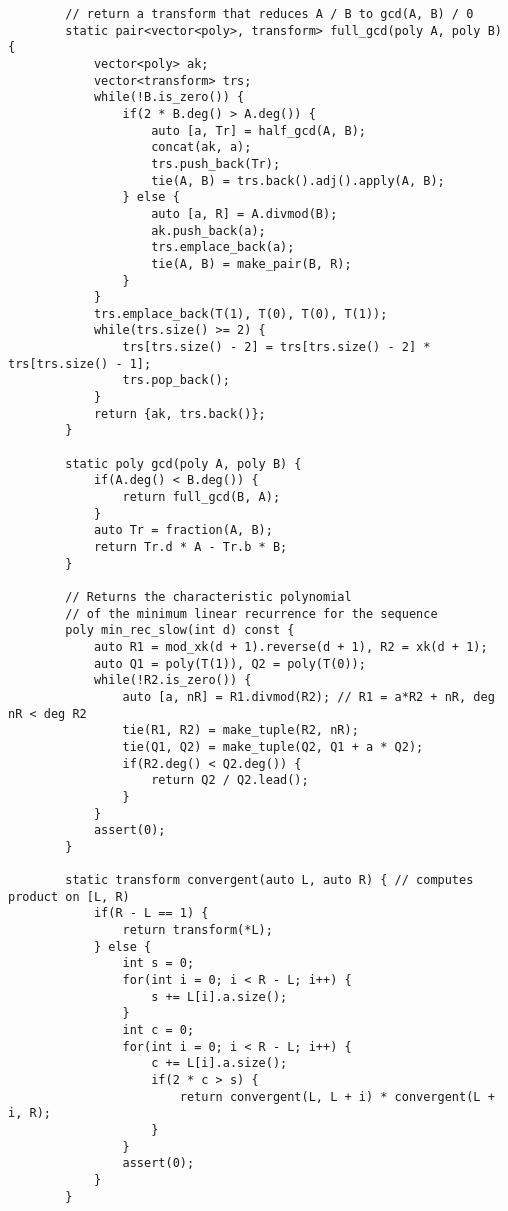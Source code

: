 \begin{lstlisting}
        // return a transform that reduces A / B to gcd(A, B) / 0
        static pair<vector<poly>, transform> full_gcd(poly A, poly B) {
            vector<poly> ak;
            vector<transform> trs;
            while(!B.is_zero()) {
                if(2 * B.deg() > A.deg()) {
                    auto [a, Tr] = half_gcd(A, B);
                    concat(ak, a);
                    trs.push_back(Tr);
                    tie(A, B) = trs.back().adj().apply(A, B);
                } else {
                    auto [a, R] = A.divmod(B);
                    ak.push_back(a);
                    trs.emplace_back(a);
                    tie(A, B) = make_pair(B, R);
                }
            }
            trs.emplace_back(T(1), T(0), T(0), T(1));
            while(trs.size() >= 2) {
                trs[trs.size() - 2] = trs[trs.size() - 2] * trs[trs.size() - 1];
                trs.pop_back();
            }
            return {ak, trs.back()};
        }
        
        static poly gcd(poly A, poly B) {
            if(A.deg() < B.deg()) {
                return full_gcd(B, A);
            }
            auto Tr = fraction(A, B);
            return Tr.d * A - Tr.b * B;
        }
        
        // Returns the characteristic polynomial
        // of the minimum linear recurrence for the sequence
        poly min_rec_slow(int d) const {
            auto R1 = mod_xk(d + 1).reverse(d + 1), R2 = xk(d + 1);
            auto Q1 = poly(T(1)), Q2 = poly(T(0));
            while(!R2.is_zero()) {
                auto [a, nR] = R1.divmod(R2); // R1 = a*R2 + nR, deg nR < deg R2
                tie(R1, R2) = make_tuple(R2, nR);
                tie(Q1, Q2) = make_tuple(Q2, Q1 + a * Q2);
                if(R2.deg() < Q2.deg()) {
                    return Q2 / Q2.lead();
                }
            }
            assert(0);
        }
        
        static transform convergent(auto L, auto R) { // computes product on [L, R)
            if(R - L == 1) {
                return transform(*L);
            } else {
                int s = 0;
                for(int i = 0; i < R - L; i++) {
                    s += L[i].a.size();
                }
                int c = 0;
                for(int i = 0; i < R - L; i++) {
                    c += L[i].a.size();
                    if(2 * c > s) {
                        return convergent(L, L + i) * convergent(L + i, R);
                    }
                }
                assert(0);
            }
        }
        

\end{lstlisting}
